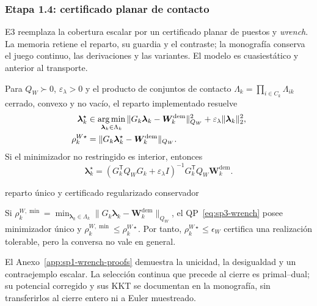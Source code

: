 \subsubsection{Etapa 1.4: certificado planar de contacto}
\label{subsubsec:sp1-contacts}



E3 reemplaza la cobertura escalar por un certificado planar de puestos y
\emph{wrench}. La memoria retiene el reparto, su guardia y el contraste; la
monografía conserva el juego continuo, las derivaciones y las variantes. El
modelo es cuasiestático y anterior al transporte.

Para $Q_W\succ0$, $\varepsilon_\lambda>0$ y el producto de conjuntos de
contacto $\Lambda_k=\prod_{i\in C_k}\Lambda_{ik}$ cerrado, convexo y no vacío,
el reparto implementado resuelve
\begin{align}
 \boldsymbol\lambda_k^\star&\in\operatorname*{arg\,min}_{\boldsymbol\lambda_k\in\Lambda_k}
 \|G_k\boldsymbol\lambda_k-\boldsymbol W_k^{\mathrm{dem}}\|_{Q_W}^{2}
 +\varepsilon_\lambda\|\boldsymbol\lambda_k\|_2^2, \label{eq:sp3-wrench}\\
 \rho_k^{W\star}&=\|G_k\boldsymbol\lambda_k^\star-
 \boldsymbol W_k^{\mathrm{dem}}\|_{Q_W}. \nonumber
\end{align}
Si el minimizador no restringido es interior, entonces
\begin{equation}
 \boldsymbol\lambda_k^\star=(G_k^{\mathsf T}Q_WG_k+\varepsilon_\lambda I)^{-1}
 G_k^{\mathsf T}Q_W\boldsymbol W_k^{\mathrm{dem}}.
 \label{eq:sp3-interior-wrench-solution}
\end{equation}

\begin{contribucion}{reparto único y certificado regularizado conservador}
\begin{proposicion}
\label{prop:pre-sp1-wrench-residual}
Si $\rho_k^{W,\min}=\min_{\boldsymbol\lambda_k\in\Lambda_k}
\|G_k\boldsymbol\lambda_k-\boldsymbol W_k^{\mathrm{dem}}\|_{Q_W}$, el
QP~\eqref{eq:sp3-wrench} posee minimizador único y
$\rho_k^{W,\min}\leq\rho_k^{W\star}$. Por tanto,
$\rho_k^{W\star}\leq\epsilon_W$ certifica una realización tolerable, pero la
conversa no vale en general.
\end{proposicion}
\end{contribucion}
El Anexo~\ref{app:sp1-wrench-proofs} demuestra la unicidad, la desigualdad y un
contraejemplo escalar. La selección continua que precede al cierre es
primal--dual; su potencial corregido y sus KKT se documentan en la monografía,
sin transferirlos al cierre entero ni a Euler muestreado.


